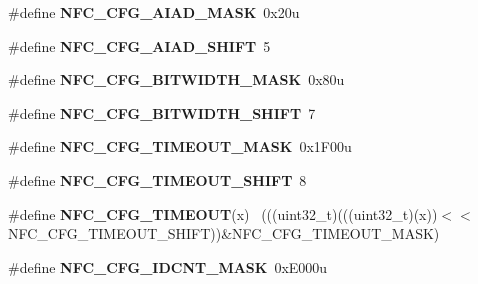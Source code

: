 \begin{DoxyCompactItemize}
\item 
\hypertarget{group___n_f_c___register___masks_ga128523833d4599f84f41dd74ef1c02dd}{}\#define {\bfseries N\+F\+C\+\_\+\+C\+F\+G\+\_\+\+A\+I\+A\+D\+\_\+\+M\+A\+S\+K}~0x20u\label{group___n_f_c___register___masks_ga128523833d4599f84f41dd74ef1c02dd}

\item 
\hypertarget{group___n_f_c___register___masks_ga3c090c34f4d512c06a1e431ecf4290b0}{}\#define {\bfseries N\+F\+C\+\_\+\+C\+F\+G\+\_\+\+A\+I\+A\+D\+\_\+\+S\+H\+I\+F\+T}~5\label{group___n_f_c___register___masks_ga3c090c34f4d512c06a1e431ecf4290b0}

\item 
\hypertarget{group___n_f_c___register___masks_ga8de1848ad50aa667509cf04f802d95b5}{}\#define {\bfseries N\+F\+C\+\_\+\+C\+F\+G\+\_\+\+B\+I\+T\+W\+I\+D\+T\+H\+\_\+\+M\+A\+S\+K}~0x80u\label{group___n_f_c___register___masks_ga8de1848ad50aa667509cf04f802d95b5}

\item 
\hypertarget{group___n_f_c___register___masks_ga76ee42dbfba5cf40ba3714024af76377}{}\#define {\bfseries N\+F\+C\+\_\+\+C\+F\+G\+\_\+\+B\+I\+T\+W\+I\+D\+T\+H\+\_\+\+S\+H\+I\+F\+T}~7\label{group___n_f_c___register___masks_ga76ee42dbfba5cf40ba3714024af76377}

\item 
\hypertarget{group___n_f_c___register___masks_ga750f0a56db6e582f18abada8887c17de}{}\#define {\bfseries N\+F\+C\+\_\+\+C\+F\+G\+\_\+\+T\+I\+M\+E\+O\+U\+T\+\_\+\+M\+A\+S\+K}~0x1\+F00u\label{group___n_f_c___register___masks_ga750f0a56db6e582f18abada8887c17de}

\item 
\hypertarget{group___n_f_c___register___masks_gaac7e8e9b5148393f54026c19956de017}{}\#define {\bfseries N\+F\+C\+\_\+\+C\+F\+G\+\_\+\+T\+I\+M\+E\+O\+U\+T\+\_\+\+S\+H\+I\+F\+T}~8\label{group___n_f_c___register___masks_gaac7e8e9b5148393f54026c19956de017}

\item 
\hypertarget{group___n_f_c___register___masks_gae7375cdaa4225196fa4e561a660d6f82}{}\#define {\bfseries N\+F\+C\+\_\+\+C\+F\+G\+\_\+\+T\+I\+M\+E\+O\+U\+T}(x)                                          ~(((uint32\+\_\+t)(((uint32\+\_\+t)(x))$<$$<$N\+F\+C\+\_\+\+C\+F\+G\+\_\+\+T\+I\+M\+E\+O\+U\+T\+\_\+\+S\+H\+I\+F\+T))\&N\+F\+C\+\_\+\+C\+F\+G\+\_\+\+T\+I\+M\+E\+O\+U\+T\+\_\+\+M\+A\+S\+K)\label{group___n_f_c___register___masks_gae7375cdaa4225196fa4e561a660d6f82}

\item 
\hypertarget{group___n_f_c___register___masks_ga91636e8d3559275b778234ccfde1445e}{}\#define {\bfseries N\+F\+C\+\_\+\+C\+F\+G\+\_\+\+I\+D\+C\+N\+T\+\_\+\+M\+A\+S\+K}~0x\+E000u\label{group___n_f_c___register___masks_ga91636e8d3559275b778234ccfde1445e}


\end{DoxyCompactItemize}
